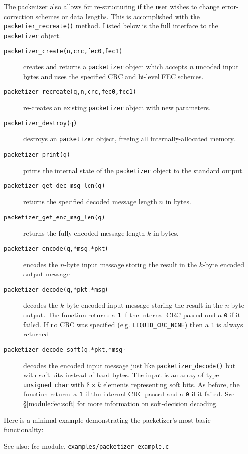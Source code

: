
The packetizer also allows for re-structuring if the user wishes to change
error-correction schemes or data lengths.  This is accomplished with the
{\tt packetier\_recreate()} method.
Listed below is the full interface to the {\tt packetizer} object.
%
\begin{description}
\item[{\tt packetizer\_create(n,crc,fec0,fec1)}]
    creates and returns a {\tt packetizer} object which accepts $n$
    uncoded input bytes and uses the specified CRC and bi-level FEC
    schemes.
\item[{\tt packetizer\_recreate(q,n,crc,fec0,fec1)}]
    re-creates an existing {\tt packetizer} object with new parameters.
\item[{\tt packetizer\_destroy(q)}]
    destroys an {\tt packetizer} object, freeing all
    internally-allocated memory.
\item[{\tt packetizer\_print(q)}]
    prints the internal state of the {\tt packetizer} object to the
    standard output.
\item[{\tt packetizer\_get\_dec\_msg\_len(q)}]
    returns the specified decoded message length $n$ in bytes.
\item[{\tt packetizer\_get\_enc\_msg\_len(q)}]
    returns the fully-encoded message length $k$ in bytes.
\item[{\tt packetizer\_encode(q,*msg,*pkt)}]
    encodes the $n$-byte input message storing the result in the
    $k$-byte encoded output message.
\item[{\tt packetizer\_decode(q,*pkt,*msg)}]
    decodes the $k$-byte encoded input message storing the result in the
    $n$-byte output.
    The function returns a {\tt 1} if the internal CRC passed
    and a {\tt 0} if it failed.
    If no CRC was specified (e.g. {\tt LIQUID\_CRC\_NONE}) then a {\tt 1} is
    always returned.
\item[{\tt packetizer\_decode\_soft(q,*pkt,*msg)}]
    decodes the encoded input message just like
    {\tt packetizer\_decode()}
    but with soft bits instead of hard bytes.
    The input is an array of type {\tt unsigned char} with $8 \times k$
    elements representing soft bits.
    As before, the function returns a {\tt 1} if the internal CRC passed
    and a {\tt 0} if it failed.
    See \S\ref{module:fec:soft} for more information on
    soft-decision decoding.
\end{description}
%
Here is a minimal example demonstrating the packetizer's most basic
functionality:
%

%
See also: fec module, {\tt examples/packetizer\_example.c}


